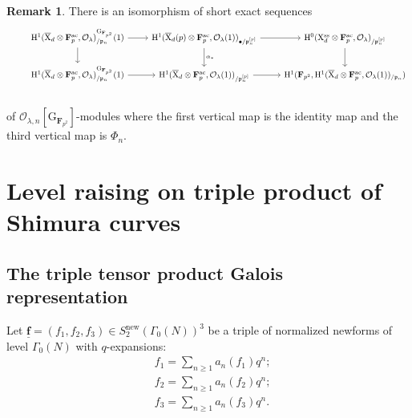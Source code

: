 \documentclass[10pt]{amsart}
\numberwithin{equation}{section}
\theoremstyle{plain}
\numberwithin{equation}{section}
\theoremstyle{definition}
\newtheorem{remark}[equation]{Remark}
\theoremstyle{remark}
\def\new{\mathrm{new}}
\def\ac{\mathrm{ac}}
\def\ss{\mathrm{ss}}
\def\ac{\mathrm{ac}}
\def\calO{\mathcal{O}}
\def\frakp{\mathfrak{p}}
\def\FF{\mathbf{F}}
\def\rmG{\mathrm{G}}
\def\rmH{\mathrm{H}}
\def\rmX{\mathrm{X}}
\begin{document}
\begin{remark}
There is an isomorphism of short exact sequences 
\begin{equation*}
\begin{tikzcd}
&\rmH^{1}(\overline{\rmX}_{d}\otimes{\FF^{\ac}_{p}}, \calO_{\lambda})_{/\frakp_{n}}^{\rmG_{\FF_{p^{2}}}}(1) \arrow[r] \arrow[d]      & \rmH^{1}(\overline{\rmX}_{d}(p)\otimes{\FF^{\ac}_{p}}, \calO_{\lambda}(1))_{\bullet/\frakp^{[p]}_{n}} \arrow[r] \arrow[d, "\alpha_{\ast}"] & \rmH^{0}(\rmX^{\ss}_{d}\otimes{\FF^{\ac}_{p}}, \calO_{\lambda})_{/\frakp^{[p]}_{n}}\arrow[d] \\
&\rmH^{1}(\overline{\rmX}_{d}\otimes{\FF^{\ac}_{p}}, \calO_{\lambda})_{/\frakp_{n}}^{\rmG_{\FF_{p^{2}}}}(1) \arrow[r] & \rmH^{1}(\overline{\rmX}_{d}\otimes {\FF^{\ac}_{p}}, \calO_{\lambda}(1))_{/\frakp^{[p]}_{n}}\arrow[r] & \rmH^{1}(\FF_{p^{2}},\rmH^{1}(\overline{\rmX}_{d}\otimes{\FF^{\ac}_{p}}, \calO_{\lambda}(1))_{/\frakp_{n}})\\  
\end{tikzcd}
\end{equation*}
of $\calO_{\lambda,n}[\rmG_{\FF_{p^{2}}}]$-modules where the first vertical map is the identity map and the third vertical map is $\Phi_{n}$.
\end{remark}




\section{Level raising on triple product of Shimura curves}
\subsection{The triple tensor product Galois representation} Let $\underline{\mathbf{f}}=(f_{1}, f_{2}, f_{3})\in S^{\new}_{2}(\Gamma_{0}(N))^{3}$ be a triple of normalized newforms of level $\Gamma_{0}(N)$ with $q$-expansions: 
\begin{equation*}
\begin{aligned}
&f_{1}=\sum_{n\geq 1} a_{n}(f_{1})q^{n};\\
&f_{2}=\sum_{n\geq 1} a_{n}(f_{2})q^{n};\\
&f_{3}=\sum_{n\geq 1} a_{n}(f_{3})q^{n}.\\
\end{aligned}
\end{equation*} 
\end{document}
